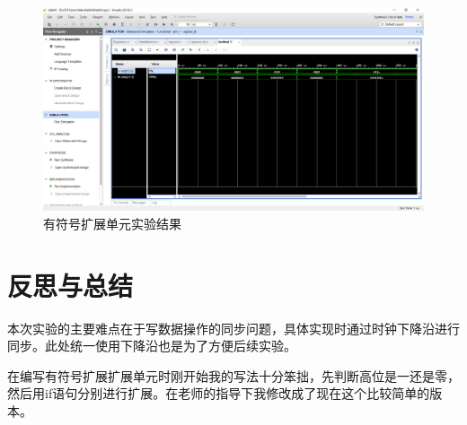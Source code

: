 \documentclass{progartcn}
\begin{document}
\begin{figure}[htbp]
    \centering
    \includegraphics[scale=0.3]{../figure/04/lab04-3.PNG}
    \caption{有符号扩展单元实验结果}\label{fig:3}
\end{figure}


\section{反思与总结}

本次实验的主要难点在于写数据操作的同步问题，具体实现时通过时钟下降沿进行同步。此处统一使用下降沿也是为了方便后续实验。

在编写有符号扩展扩展单元时刚开始我的写法十分笨拙，先判断高位是一还是零，然后用if语句分别进行扩展。在老师的指导下我修改成了现在这个比较简单的版本。
\end{document}
